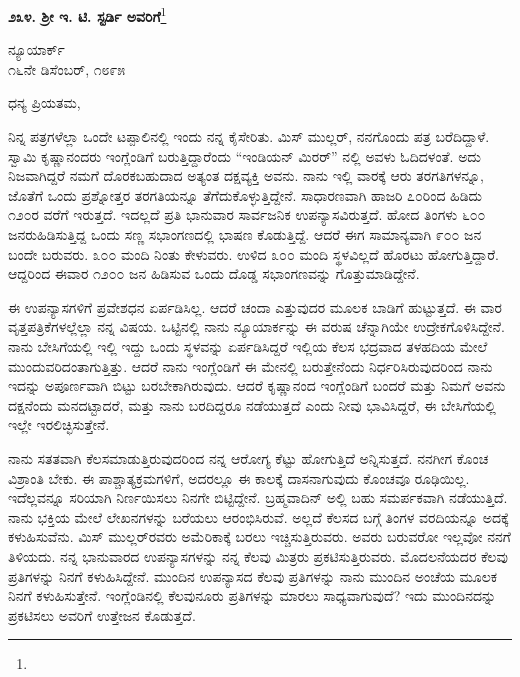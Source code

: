 \eject

\begin{center}
\textbf{೨೩೪. ಶ‍್ರೀ ಇ. ಟಿ. ಸ್ಟರ್ಡಿ ಅವರಿಗೆ}\footnote{}
\end{center}

\vspace{-0.7cm}

\begin{flushright}
ನ್ಯೂಯಾರ್ಕ್\\೧೬ನೇ ಡಿಸೆಂಬರ್, ೧೮೯೫
\end{flushright}

\vspace{-0.3cm}

\noindent
ಧನ್ಯ ಪ್ರಿಯತಮ,

ನಿನ್ನ ಪತ್ರಗಳೆಲ್ಲಾ ಒಂದೇ ಟಪ್ಪಾಲಿನಲ್ಲಿ ಇಂದು ನನ್ನ ಕೈಸೇರಿತು. ಮಿಸ್ ಮುಲ್ಲರ್, ನನಗೊಂದು ಪತ್ರ ಬರೆದಿದ್ದಾಳೆ. ಸ್ವಾಮಿ ಕೃಷ್ಣಾನಂದರು ಇಂಗ್ಲೆಂಡಿಗೆ ಬರುತ್ತಿದ್ದಾರೆಂದು “ಇಂಡಿಯನ್ ಮಿರರ್” ನಲ್ಲಿ ಅವಳು ಓದಿದಳಂತೆ. ಅದು ನಿಜವಾಗಿದ್ದರೆ ನಮಗೆ ದೊರಕಬಹುದಾದ ಅತ್ಯಂತ ದಕ್ಷವ್ಯಕ್ತಿ ಅವನು. ನಾನು ಇಲ್ಲಿ ವಾರಕ್ಕೆ ಆರು ತರಗತಿಗಳನ್ನೂ, ಜೊತೆಗೆ ಒಂದು ಪ್ರಶ್ನೋತ್ತರ ತರಗತಿಯನ್ನೂ ತೆಗೆದುಕೊಳ್ಳುತ್ತಿದ್ದೇನೆ. ಸಾಧಾರಣವಾಗಿ ಹಾಜರಿ ೭೦ರಿಂದ ಹಿಡಿದು ೧೨೦ರ ವರೆಗೆ ಇರುತ್ತದೆ. ಇದಲ್ಲದೆ ಪ್ರತಿ ಭಾನುವಾರ ಸಾರ್ವಜನಿಕ ಉಪನ್ಯಾಸವಿರುತ್ತದೆ. ಹೋದ ತಿಂಗಳು ೬೦೦ ಜನರುಹಿಡಿಸುತ್ತಿದ್ದ ಒಂದು ಸಣ್ಣ ಸಭಾಂಗಣದಲ್ಲಿ ಭಾಷಣ ಕೊಡುತ್ತಿದ್ದೆ. ಆದರೆ ಈಗ ಸಾಮಾನ್ಯವಾಗಿ ೯೦೦ ಜನ ಬಂದೇ ಬರುವರು. ೩೦೦ ಮಂದಿ ನಿಂತು ಕೇಳುವರು. ಉಳಿದ ೩೦೦ ಮಂದಿ ಸ್ಥಳವಿಲ್ಲದೆ ಹೊರಟು ಹೋಗುತ್ತಿದ್ದಾರೆ. ಆದ್ದರಿಂದ ಈವಾರ ೧೨೦೦ ಜನ ಹಿಡಿಸುವ ಒಂದು ದೊಡ್ಡ ಸಭಾಂಗಣವನ್ನು ಗೊತ್ತುಮಾಡಿದ್ದೇನೆ.

ಈ ಉಪನ್ಯಾಸಗಳಿಗೆ ಪ್ರವೇಶಧನ ಏರ್ಪಡಿಸಿಲ್ಲ. ಆದರೆ ಚಂದಾ ಎತ್ತುವುದರ ಮೂಲಕ ಬಾಡಿಗೆ ಹುಟ್ಟುತ್ತದೆ. ಈ ವಾರ ವೃತ್ತಪತ್ರಿಕೆಗಳಲ್ಲೆಲ್ಲಾ ನನ್ನ ವಿಷಯ. ಒಟ್ಟಿನಲ್ಲಿ ನಾನು ನ್ಯೂಯಾರ್ಕನ್ನು ಈ ವರುಷ ಚೆನ್ನಾಗಿಯೇ ಉದ್ರೇಕಗೊಳಿಸಿದ್ದೇನೆ. ನಾನು ಬೇಸಿಗೆಯಲ್ಲಿ ಇಲ್ಲಿ ಇದ್ದು ಒಂದು ಸ್ಥಳವನ್ನು ಏರ್ಪಡಿಸಿದ್ದರೆ ಇಲ್ಲಿಯ ಕೆಲಸ ಭದ್ರವಾದ ತಳಹದಿಯ ಮೇಲೆ ಮುಂದುವರಿದಂತಾಗುತ್ತಿತ್ತು. ಆದರೆ ನಾನು ಇಂಗ್ಲೆಂಡಿಗೆ ಈ ಮೇನಲ್ಲಿ ಬರುತ್ತೇನೆಂದು ನಿರ್ಧರಿಸಿರುವುದರಿಂದ ನಾನು ಇದನ್ನು ಅಪೂರ್ಣವಾಗಿ ಬಿಟ್ಟು ಬರಬೇಕಾಗಿರುವುದು. ಆದರೆ ಕೃಷ್ಣಾನಂದ ಇಂಗ್ಲೆಂಡಿಗೆ ಬಂದರೆ ಮತ್ತು ನಿಮಗೆ ಅವನು ದಕ್ಷನೆಂದು ಮನದಟ್ಟಾದರೆ, ಮತ್ತು ನಾನು ಬರದಿದ್ದರೂ ನಡೆಯುತ್ತದೆ ಎಂದು ನೀವು ಭಾವಿಸಿದ್ದರೆ, ಈ ಬೇಸಿಗೆಯಲ್ಲಿ ಇಲ್ಲೇ ಇರಲಿಚ್ಛಿಸುತ್ತೇನೆ.

ನಾನು ಸತತವಾಗಿ ಕೆಲಸಮಾಡುತ್ತಿರುವುದರಿಂದ ನನ್ನ ಆರೋಗ್ಯ ಕೆಟ್ಟು ಹೋಗುತ್ತಿದೆ ಅನ್ನಿಸುತ್ತದೆ. ನನಗೀಗ ಕೊಂಚ ವಿಶ್ರಾಂತಿ ಬೇಕು. ಈ ಪಾಶ್ಚಾತ್ಯಕ್ರಮಗಳಿಗೆ, ಅದರಲ್ಲೂ ಈ ಕಾಲಕ್ಕೆ ದಾಸನಾಗುವುದು ಕೊಂಚವೂ ರೂಢಿಯಿಲ್ಲ. ಇದೆಲ್ಲವನ್ನೂ ಸರಿಯಾಗಿ ನಿರ್ಣಯಿಸಲು ನಿನಗೇ ಬಿಟ್ಟಿದ್ದೇನೆ. ಬ್ರಹ್ಮವಾದಿನ್ ಅಲ್ಲಿ ಬಹು ಸಮರ್ಪಕವಾಗಿ ನಡೆಯುತ್ತಿದೆ. ನಾನು ಭಕ್ತಿಯ ಮೇಲೆ ಲೇಖನಗಳನ್ನು ಬರೆಯಲು ಆರಂಭಿಸಿರುವೆ. ಅಲ್ಲದೆ ಕೆಲಸದ ಬಗ್ಗೆ ತಿಂಗಳ ವರದಿಯನ್ನೂ ಅದಕ್ಕೆ ಕಳುಹಿಸುವೆನು. ಮಿಸ್ ಮುಲ್ಲರ್‌ರವರು ಅಮೆರಿಕಾಕ್ಕೆ ಬರಲು ಇಚ್ಚಿಸುತ್ತಿರುವರು. ಅವರು ಬರುವರೋ ಇಲ್ಲವೋ ನನಗೆ ತಿಳಿಯದು. ನನ್ನ ಭಾನುವಾರದ ಉಪನ್ಯಾಸಗಳನ್ನು ನನ್ನ ಕೆಲವು ಮಿತ್ರರು ಪ್ರಕಟಿಸುತ್ತಿರುವರು. ಮೊದಲನೆಯದರ ಕೆಲವು ಪ್ರತಿಗಳನ್ನು ನಿನಗೆ ಕಳುಹಿಸಿದ್ದೇನೆ. ಮುಂದಿನ ಉಪನ್ಯಾಸದ ಕೆಲವು ಪ್ರತಿಗಳನ್ನು ನಾನು ಮುಂದಿನ ಅಂಚೆಯ ಮೂಲಕ ನಿನಗೆ ಕಳುಹಿಸುತ್ತೇನೆ. ಇಂಗ್ಲೆಂಡಿನಲ್ಲಿ ಕೆಲವುನೂರು ಪ್ರತಿಗಳನ್ನು ಮಾರಲು ಸಾಧ್ಯವಾಗುವುದೆ? ಇದು ಮುಂದಿನದನ್ನು ಪ್ರಕಟಿಸಲು ಅವರಿಗೆ ಉತ್ತೇಜನ ಕೊಡುತ್ತದೆ.

